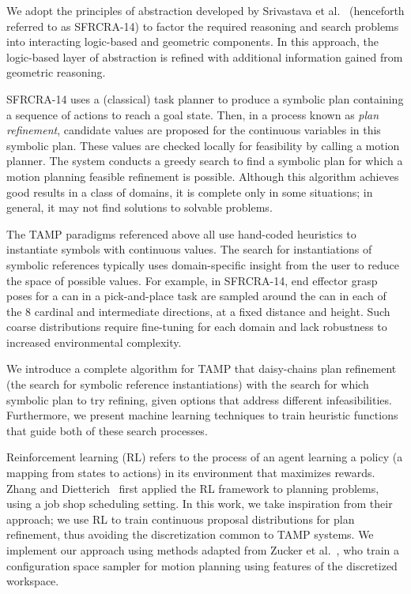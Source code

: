 We adopt the principles of abstraction developed by Srivastava et
al.~\cite{srivastava2014combined} (henceforth referred to as SFRCRA-14) to factor the required reasoning and
search problems into interacting logic-based and geometric components. In this approach, the
logic-based layer of abstraction is refined with additional information gained from geometric reasoning.

SFRCRA-14 uses a (classical) task planner to produce a symbolic plan containing
a sequence of actions to reach a goal state. Then, in a process known as \emph{plan refinement},
candidate values are proposed for the continuous variables in this symbolic plan.
These values are checked locally for feasibility by calling a motion planner.
The system conducts a greedy search to find a symbolic plan for which
a motion planning feasible refinement is possible. Although this algorithm achieves good results
in a class of domains, it is complete only in some situations; in
general, it may not find solutions to solvable problems.

The TAMP paradigms referenced above all use hand-coded
heuristics to instantiate symbols with continuous values.
The search for instantiations of symbolic
references typically uses domain-specific insight from the user to reduce
the space of possible values. For example, in SFRCRA-14,
end effector grasp poses for a can in a pick-and-place task are sampled around the can in
each of the 8 cardinal and intermediate directions, at a fixed
distance and height. Such coarse distributions require
fine-tuning for each domain and lack robustness to increased
environmental complexity.

We introduce a complete algorithm for TAMP that daisy-chains plan refinement (the search for symbolic
reference instantiations) with the search for which symbolic plan to try refining, given options that address different
infeasibilities. Furthermore, we present machine learning techniques to train heuristic
functions that guide both of these search processes.

Reinforcement learning (RL) refers to the process of an agent learning a policy (a mapping from states to actions)
in its environment that maximizes rewards. Zhang and Dietterich~\cite{JobShopSched} first applied the RL framework
to planning problems, using a job shop scheduling setting. In this work, we take inspiration from
their approach; we use RL to train continuous proposal distributions for
plan refinement, thus avoiding the discretization common to TAMP systems. We implement our approach using methods adapted from
Zucker et al.~\cite{workspacebias}, who train a configuration space sampler for motion planning
using features of the discretized workspace.

